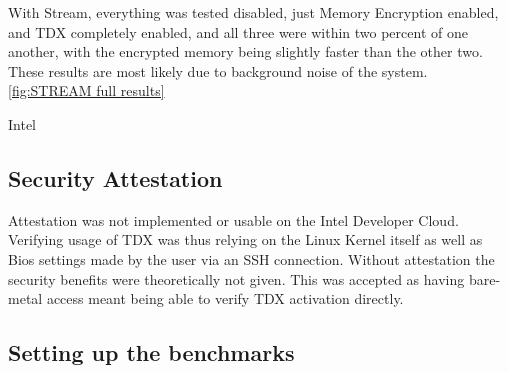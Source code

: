 With Stream, everything was tested disabled, just Memory Encryption enabled, and TDX completely enabled, and all three were within two percent of one another, with the encrypted memory being slightly faster than the other two. These results are most likely due to background noise of the system. \ref{fig:STREAM full results}

\begin{table}[]
    \centering
    \caption{Comparison of Memory Access speed using STREAM for various Non-VM settings as well as legacy VMs and TD}
\end{table}

Intel

\subsection{Security Attestation}

Attestation was not implemented or usable on the Intel Developer Cloud. Verifying usage of TDX was thus relying on the Linux Kernel itself as well as Bios settings made by the user via an SSH connection. Without attestation the security benefits were theoretically not given. This was accepted as having bare-metal access meant being able to verify TDX activation directly.


\subsection{Setting up the benchmarks}
\label{sec:SecondContent:SecondSection}

